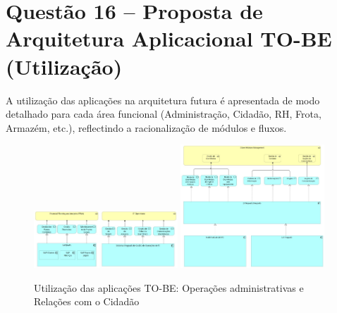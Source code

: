 \documentclass[12pt,a4paper,final]{article}
\begin{document}
    \section*{Questão 16 – Proposta de Arquitetura Aplicacional TO-BE (Utilização)}

    A utilização das aplicações na arquitetura futura é apresentada de modo detalhado para cada área funcional (Administração, Cidadão, RH, Frota, Armazém, etc.), reflectindo a racionalização de módulos e fluxos.

    \begin{figure}[H]
        \centering
        \includegraphics[width=0.48\textwidth]{Q16 - Application Usage - Admin Operations.jpg}
        \includegraphics[width=0.48\textwidth]{Q16 - Application Usage - Citzen Relations Management.jpg}
        \caption{Utilização das aplicações TO-BE: Operações administrativas e Relações com o Cidadão}
        \label{fig:q16-usage-admin-cidadao}
    \end{figure}
\end{document}
